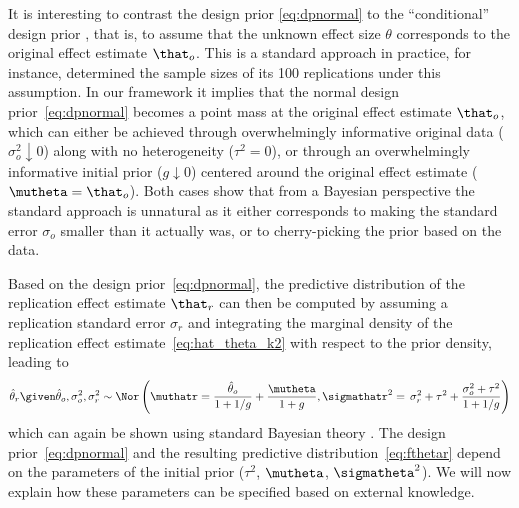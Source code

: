 It is interesting to contrast the design prior \eqref{eq:dpnormal} to the
``conditional'' design prior \citep{Micheloud2020}, that is, to assume that the
unknown effect size $\theta$ corresponds to the original effect estimate
$\that_{o}$. This is a standard approach in practice, for instance,
\citet{Opensc2015} determined the sample sizes of its 100 replications under
this assumption. In our framework it implies that the normal design
prior~\eqref{eq:dpnormal} becomes a point mass at the original effect estimate
$\that_{o}$, which can either be achieved through overwhelmingly informative
original data ($\sigma^{2}_{o} \downarrow 0$) along with no heterogeneity
($\tau^{2} = 0$), or through an overwhelmingly informative initial prior
($g \downarrow 0$) centered around the original effect estimate
($\mutheta = \that_{o}$). Both cases show that from a Bayesian perspective the
standard approach is unnatural as it either corresponds to making the standard
error $\sigma_{o}$ smaller than it actually was, or to cherry-picking the prior
based on the data.


Based on the design prior~\eqref{eq:dpnormal}, the predictive distribution of
the replication effect estimate $\that_{r}$ can then be computed by assuming a
replication standard error $\sigma_{r}$ and integrating the marginal density of
the replication effect estimate~\eqref{eq:hat_theta_k2} with respect to the
prior density, leading to
\begin{align}
  \label{eq:fthetar}
  \hat{\theta}_r \given \hat{\theta}_o, \sigma^2_o, \sigma^2_r
  \sim
  \Nor\left(\muthatr =
  \frac{\hat{\theta}_o}{1 + 1/g} + \frac{\mutheta}{1 + g}, \sigmathatr^{2} =
  \, \sigma^2_r + \tau^2 + \frac{\sigma^2_o + \tau^2}{1 + 1/g}\right)
\end{align}
which can again be shown using standard Bayesian theory \citep[ch.
3.13.3]{Spiegelhalter2004}.
The design prior~\eqref{eq:dpnormal} and the resulting predictive
distribution~\eqref{eq:fthetar}
depend on the parameters of the initial prior ($\tau^ {2}$, $\mutheta$,
$\sigmatheta^{2}$). We will now explain how these parameters can be specified
based on external knowledge.

